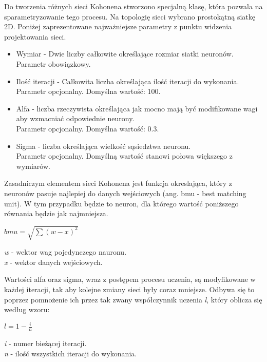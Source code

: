 \documentclass[12pt, notitlepage]{article}
\begin{document}
Do tworzenia różnych sieci Kohonena stworzono specjalną klasę, która pozwala na sparametryzowanie tego procesu. Na topologię sieci wybrano prostokątną siatkę 2D. Poniżej zaprezentowane najważniejsze parametry z punktu widzenia projektowania sieci.
\begin{itemize}
    \item Wymiar - Dwie liczby całkowite określające rozmiar siatki neuronów. 
    \\Parametr obowiązkowy.
    \item Ilość iteracji - Całkowita liczba określająca ilość iteracji do wykonania.
    \\Parametr opcjonalny. Domyślna wartość: 100.
    \item Alfa - liczba rzeczywista określająca jak mocno mają być modifikowane wagi aby wzmacniać odpowiednie neurony.
    \\Parametr opcjonalny. Domyślna wartość: 0.3.
    \item Sigma - liczba określająca wielkość sąsiedztwa neuronu.
    \\ Parametr opcjonalny. Domyślną wartość stanowi połowa większego z wymiarów.
\end{itemize}

Zasadniczym elementem sieci Kohonena jest funkcja okreslająca, który z neuronów pasuje najlepiej do danych wejściowych (ang. bmu - best matching unit). W tym przypadku będzie to neuron, dla którego wartość poniższego równania będzie jak najmniejsza.
\begin{center}
    $ bmu = \sqrt{\sum (w - x)^2} $ \\
\end{center}
\textit{w} - wektor wag pojedynczego nauronu. \\
\textit{x} - wektor danych wejściowych.

Wartości alfa oraz sigma, wraz z postępem procesu uczenia, są modyfikowane w każdej iteracji, tak aby kolejne zmiany sieci były coraz mniejsze. Odbywa się to poprzez pomnożenie ich przez tak zwany współczynnik uczenia \textit{l}, który oblicza się według wzoru:
\begin{center}
    $ l = 1 - \frac{i}{n} $ \\
\end{center}
\textit{i} - numer bieżącej iteracji. \\
\textit{n} - ilość wszystkich iteracji do wykonania.
\end{document}

